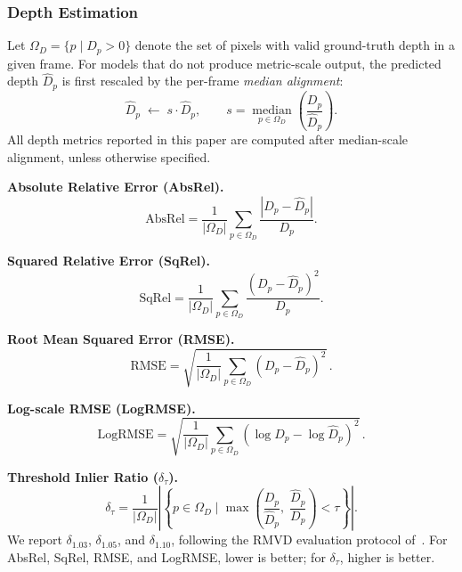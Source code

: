 \documentclass{llmxive}
\begin{document}
\subsubsection{Depth Estimation}
\label{appendix:metrics:depth}
Let $\Omega_D = \{p \mid D_p > 0\}$ denote the set of pixels with valid ground-truth depth in a given frame.
%
For models that do not produce metric-scale output, the predicted depth $\hat{D}_p$ is first rescaled by the per-frame \emph{median alignment}:
\begin{equation}
  \hat{D}_p \;\leftarrow\; s\cdot\hat{D}_p,
  \qquad
  s = \operatorname*{median}_{p\in\Omega_D}\!\left(\frac{D_p}{\hat{D}_p}\right).
  \label{eq:median_align}
\end{equation}
%
All depth metrics reported in this paper are computed after median-scale alignment, unless otherwise specified.

\textbf{Absolute Relative Error (AbsRel).}
\begin{equation}
  \mathrm{AbsRel}
  = \frac{1}{|\Omega_D|}\sum_{p\in\Omega_D}
    \frac{\left|D_p - \hat{D}_p\right|}{D_p}.
  \label{eq:absrel}
\end{equation}

\textbf{Squared Relative Error (SqRel).}
\begin{equation}
  \mathrm{SqRel}
  = \frac{1}{|\Omega_D|}\sum_{p\in\Omega_D}
    \frac{\left(D_p - \hat{D}_p\right)^{2}}{D_p}.
  \label{eq:sqrel}
\end{equation}

\textbf{Root Mean Squared Error (RMSE).}
\begin{equation}
  \mathrm{RMSE}
  = \sqrt{\frac{1}{|\Omega_D|}\sum_{p\in\Omega_D}\!\left(D_p - \hat{D}_p\right)^{2}}\,.
  \label{eq:rmse}
\end{equation}

\textbf{Log-scale RMSE (LogRMSE).}
\begin{equation}
  \mathrm{LogRMSE}
  = \sqrt{\frac{1}{|\Omega_D|}\sum_{p\in\Omega_D}\!\left(\log D_p - \log\hat{D}_p\right)^{2}}\,.
  \label{eq:logrmse}
\end{equation}

\textbf{Threshold Inlier Ratio ($\delta_{\tau}$).}
\begin{equation}
  \delta_{\tau}
  = \frac{1}{|\Omega_D|}
    \left|\left\{p\in\Omega_D\;\Bigg|\;
      \max\!\left(\frac{D_p}{\hat{D}_p},\;\frac{\hat{D}_p}{D_p}\right) < \tau
    \right\}\right|.
  \label{eq:delta}
\end{equation}
We report $\delta_{1.03}$, $\delta_{1.05}$, and $\delta_{1.10}$, following the RMVD evaluation protocol of~\citet{schroeppel2022rmvd}.
%
For AbsRel, SqRel, RMSE, and LogRMSE, lower is better; for $\delta_{\tau}$, higher is better.
\end{document}
